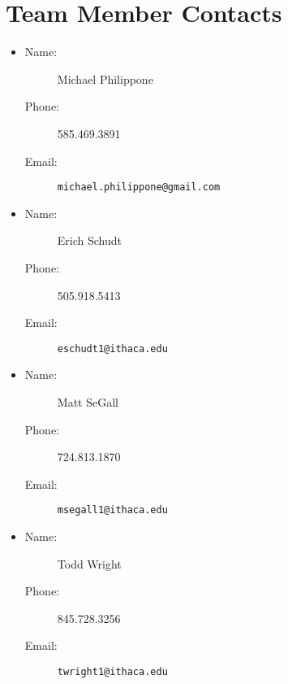 \part{Team Member Contacts}

\begin{itemize}

	\item
		\begin{description}
			\item[Name:] Michael Philippone
			\item[Phone:] 585.469.3891
			\item[Email:] \verb!michael.philippone@gmail.com!
		\end{description}
		
	\item
		\begin{description}
			\item[Name:] Erich Schudt
			\item[Phone:] 505.918.5413
			\item[Email:] \verb!eschudt1@ithaca.edu!
		\end{description}

	\item
		\begin{description}
			\item[Name:] Matt SeGall
			\item[Phone:] 724.813.1870
			\item[Email:] \verb!msegall1@ithaca.edu!
		\end{description}

	\item
		\begin{description}
			\item[Name:] Todd Wright
			\item[Phone:] 845.728.3256
			\item[Email:] \verb!twright1@ithaca.edu!
		\end{description}

\end{itemize}